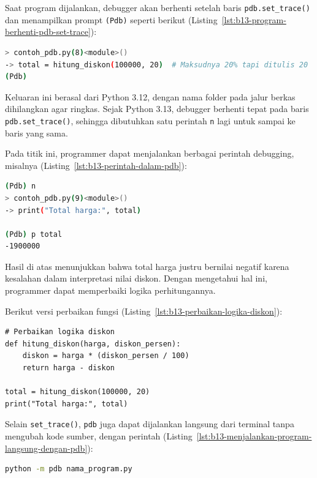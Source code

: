 Saat program dijalankan, debugger akan berhenti setelah baris \texttt{pdb.set\_trace()} dan menampilkan prompt \texttt{(Pdb)} seperti berikut (Listing~\ref{lst:b13-program-berhenti-pdb-set-trace}):

\begin{lstlisting}[language=bash, caption={Program berhenti pada pdb.set_trace()}, label={lst:b13-program-berhenti-pdb-set-trace}]
> contoh_pdb.py(8)<module>()
-> total = hitung_diskon(100000, 20)  # Maksudnya 20% tapi ditulis 20
(Pdb)
\end{lstlisting}

Keluaran ini berasal dari Python 3.12, dengan nama folder pada jalur berkas dihilangkan agar ringkas. Sejak Python 3.13, debugger berhenti tepat pada baris \texttt{pdb.set\_trace()}, sehingga dibutuhkan satu perintah \texttt{n} lagi untuk sampai ke baris yang sama.

Pada titik ini, programmer dapat menjalankan berbagai perintah debugging, misalnya (Listing~\ref{lst:b13-perintah-dalam-pdb}):

\begin{lstlisting}[language=bash, caption={Contoh perintah di dalam pdb}, label={lst:b13-perintah-dalam-pdb}]
(Pdb) n
> contoh_pdb.py(9)<module>()
-> print("Total harga:", total)

(Pdb) p total
-1900000
\end{lstlisting}

Hasil di atas menunjukkan bahwa total harga justru bernilai negatif karena kesalahan dalam interpretasi nilai diskon. Dengan mengetahui hal ini, programmer dapat memperbaiki logika perhitungannya.

Berikut versi perbaikan fungsi (Listing~\ref{lst:b13-perbaikan-logika-diskon}):

\begin{lstlisting}[style=PythonStyle, caption={Perbaikan logika diskon}, label={lst:b13-perbaikan-logika-diskon}]
# Perbaikan logika diskon
def hitung_diskon(harga, diskon_persen):
    diskon = harga * (diskon_persen / 100)
    return harga - diskon

total = hitung_diskon(100000, 20)
print("Total harga:", total)
\end{lstlisting}

Selain \texttt{set\_trace()}, \texttt{pdb} juga dapat dijalankan langsung dari terminal tanpa mengubah kode sumber, dengan perintah (Listing~\ref{lst:b13-menjalankan-program-langsung-dengan-pdb}):

\begin{lstlisting}[language=bash, caption={Menjalankan program langsung dengan pdb}, label={lst:b13-menjalankan-program-langsung-dengan-pdb}]
python -m pdb nama_program.py
\end{lstlisting}

